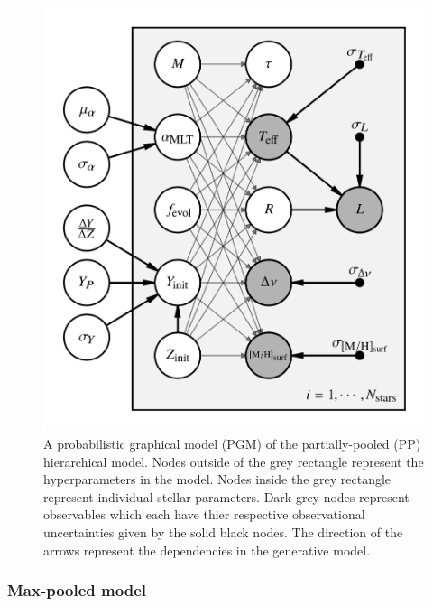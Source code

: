 \documentclass[a4paper,fleqn,usenatbib]{mnras}
\begin{document}
%
\begin{figure}
    \includegraphics[width=\linewidth]{figures/partial_pool_pgm.png}
    \caption{A probabilistic graphical model (PGM) of the partially-pooled (PP) hierarchical model. Nodes outside of the grey rectangle represent the hyperparameters in the model. Nodes inside the grey rectangle represent individual stellar parameters. Dark grey nodes represent observables which each have thier respective observational uncertainties given by the solid black nodes. The direction of the arrows represent the dependencies in the generative model.}
    \label{fig:pgm}
\end{figure}
%

\subsubsection{Max-pooled model}\label{sec:mp}
\end{document}
